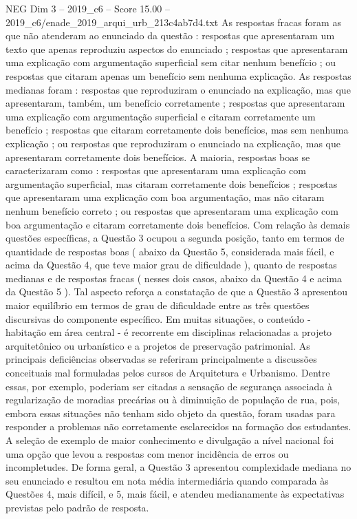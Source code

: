 \begin{textsample}{NEG Dim 3 – 2019\_c6 – Score 15.00 – 2019\_c6/enade\_2019\_arqui\_urb\_213c4ab7d4.txt}
As respostas fracas foram as que não atenderam ao enunciado da questão : respostas que apresentaram um texto que apenas reproduziu aspectos do enunciado ; respostas que apresentaram uma explicação com argumentação superficial sem citar nenhum benefício ; ou respostas que citaram apenas um benefício sem nenhuma explicação.
As respostas medianas foram : respostas que reproduziram o enunciado na explicação, mas que apresentaram, também, um benefício corretamente ; respostas que apresentaram uma explicação com argumentação superficial e citaram corretamente um benefício ; respostas que citaram corretamente dois benefícios, mas sem nenhuma explicação ; ou respostas que reproduziram o enunciado na explicação, mas que apresentaram corretamente dois benefícios.
A maioria, respostas boas se caracterizaram como : respostas que apresentaram uma explicação com argumentação superficial, mas citaram corretamente dois benefícios ; respostas que apresentaram uma explicação com boa argumentação, mas não citaram nenhum benefício correto ; ou respostas que apresentaram uma explicação com boa argumentação e citaram corretamente dois benefícios.
Com relação às demais questões específicas, a Questão 3 ocupou a segunda posição, tanto em termos de quantidade de respostas boas ( abaixo da Questão 5, considerada mais fácil, e acima da Questão 4, que teve maior grau de dificuldade ), quanto de respostas medianas e de respostas fracas ( nesses dois casos, abaixo da Questão 4 e acima da Questão 5 ).
Tal aspecto reforça a constatação de que a Questão 3 apresentou maior equilíbrio em termos de grau de dificuldade entre as três questões discursivas do componente específico.
Em muitas situações, o conteúdo - habitação em área central - é recorrente em disciplinas relacionadas a projeto arquitetônico ou urbanístico e a projetos de preservação patrimonial.
As principais deficiências observadas se referiram principalmente a discussões conceituais mal formuladas pelos cursos de Arquitetura e Urbanismo.
Dentre essas, por exemplo, poderiam ser citadas a sensação de segurança associada à regularização de moradias precárias ou à diminuição de população de rua, pois, embora essas situações não tenham sido objeto da questão, foram usadas para responder a problemas não corretamente esclarecidos na formação dos estudantes.
A seleção de exemplo de maior conhecimento e divulgação a nível nacional foi uma opção que levou a respostas com menor incidência de erros ou incompletudes.
De forma geral, a Questão 3 apresentou complexidade mediana no seu enunciado e resultou em nota média intermediária quando comparada às Questões 4, mais difícil, e 5, mais fácil, e atendeu medianamente às expectativas previstas pelo padrão de resposta.

\end{textsample}
